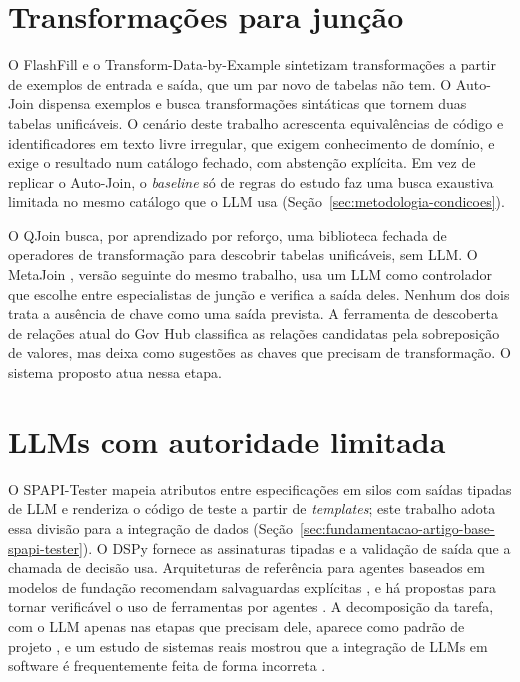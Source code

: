 \section{Transformações para junção}
\label{sec:trabalhosrelacionados-transformacoes}

O FlashFill \cite{gulwani2011flashfill} e o Transform-Data-by-Example
\cite{he2018tde} sintetizam transformações a partir de exemplos de entrada e
saída, que um par novo de tabelas não tem. O Auto-Join \cite{zhu2017autojoin}
dispensa exemplos e busca transformações sintáticas que tornem duas tabelas
unificáveis. O cenário deste trabalho acrescenta equivalências de código e
identificadores em texto livre irregular, que exigem conhecimento de domínio,
e exige o resultado num catálogo fechado, com abstenção explícita. Em vez de
replicar o Auto-Join, o \emph{baseline} só de regras do estudo faz uma busca
exaustiva limitada no mesmo catálogo que o LLM usa
(Seção~\ref{sec:metodologia-condicoes}).

O QJoin \cite{wang2025qjoin} busca, por aprendizado por reforço, uma
biblioteca fechada de operadores de transformação para descobrir tabelas
unificáveis, sem LLM. O MetaJoin \cite{wang2026metajoin}, versão seguinte do
mesmo trabalho, usa um LLM como controlador que escolhe entre especialistas
de junção e verifica a saída deles. Nenhum dos dois trata a ausência de chave
como uma saída prevista. A ferramenta de descoberta de relações atual do Gov
Hub classifica as relações candidatas pela sobreposição de valores, mas deixa
como sugestões as chaves que precisam de transformação. O sistema proposto
atua nessa etapa.

\section{LLMs com autoridade limitada}
\label{sec:trabalhosrelacionados-llm-limitado}

O SPAPI-Tester \cite{wang2025spapi} mapeia atributos entre especificações em
silos com saídas tipadas de LLM e renderiza o código de teste a partir de
\emph{templates}; este trabalho adota essa divisão para a integração de dados
(Seção~\ref{sec:fundamentacao-artigo-base-spapi-tester}). O DSPy
\cite{khattab2024dspy} fornece as assinaturas tipadas e a validação de saída
que a chamada de decisão usa. Arquiteturas de referência para agentes
baseados em modelos de fundação recomendam salvaguardas explícitas
\cite{lu2024refarch}, e há propostas para tornar verificável o uso de
ferramentas por agentes \cite{doshi2026safetool}. A decomposição da tarefa,
com o LLM apenas nas etapas que precisam dele, aparece como padrão de projeto
\cite{marquez2025patterns}, e um estudo de sistemas reais mostrou que a
integração de LLMs em software é frequentemente feita de forma incorreta
\cite{shao2025integration}.

